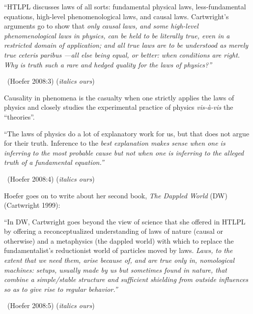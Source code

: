 \begin{myquote}
“HTLPL discusses laws of all sorts: fundamental physical laws, less-fundamental equations, high-level phenomenological laws, and causal laws. Cartwright’s arguments go to show that \textit{only causal laws, and some high-level phenomenological laws in physics, can be held to be literally true, even in a restricted domain of application; and all true laws are to be understood as merely true ceteris paribus —all else being equal, or better: when conditions are right. Why is truth such a rare and hedged quality for the laws of physics?”} 

~\hfill (Hoefer 2008:3) (\textit{italics ours})
\end{myquote}

\vskip 2pt

Causality in phenomena is the casualty when one strictly applies the laws of physics and closely studies the experimental practice of physics \textit{vis-à-vis} the “theories”.

\vskip 2pt

\begin{myquote}
“The laws of physics do a lot of explanatory work for us, but that does not argue for their truth. Inference to the \textit{best explanation makes sense when one is inferring to the most probable cause but not when one is inferring to the alleged truth of a fundamental equation.”} 

~\hfill (Hoefer 2008:4) (\textit{italics ours})
\end{myquote}

\vskip 2pt

Hoefer goes on to write about her second book, \textit{The Dappled World} (DW)(Cartwright 1999):

\vskip 2pt

\begin{myquote}
“In DW, Cartwright goes beyond the view of science that she offered in HTLPL by offering a reconceptualized understanding of laws of nature (causal or otherwise) and a metaphysics (the dappled world) with which to replace the fundamentalist’s reductionist world of particles moved by laws. \textit{Laws, to the extent that we need them, arise because of, and are true only in, nomological machines: setups, usually made by us but sometimes found in nature, that combine a simple/stable structure and sufficient shielding from outside influences so as to give rise to regular behavior.”} 

~\hfill (Hoefer 2008:5) (\textit{italics ours})
\end{myquote}

